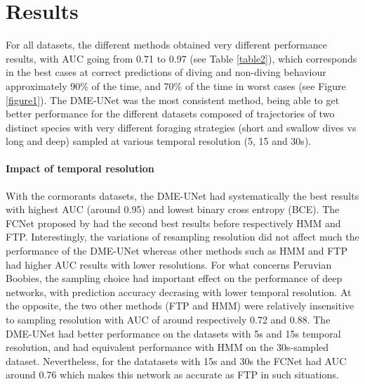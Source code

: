 \documentclass{article}
\begin{document}
\section{Results}
For all datasets, the different methods obtained very different performance results, with AUC going from 0.71 to 0.97 (see Table \ref{table2}), which corresponds in the best cases at correct predictions of diving and non-diving behaviour approximately 90\% of the time, and 70\% of the time in worst cases (see Figure \ref{figure1}). The DME-UNet was the most consistent method, being able to get better performance for the different datasets composed of trajectories of two distinct species with very different foraging strategies (short and swallow dives vs long and deep) sampled at various temporal resolution (5, 15 and 30s).

\paragraph{Impact of temporal resolution}
With the cormorants datasets, the DME-UNet had systematically the best results with highest AUC (around 0.95) and lowest binary cross entropy (BCE).
The FCNet proposed by \cite{browning_predicting_2018} had the second best results before respectively HMM and FTP.
Interestingly, the variations of resampling resolution did not affect much the performance of the DME-UNet whereas other methods such as HMM and FTP had higher AUC results with lower resolutions.
For what concerns Peruvian Boobies, the sampling choice had important effect on the performance of deep networks, with prediction accuracy decrasing with lower temporal resolution.
At the opposite, the two other methods (FTP and HMM) were relatively insensitive to sampling resolution with AUC of around respectively 0.72 and 0.88.
The DME-UNet had better performance on the datasets with 5s and 15s temporal resolution, and had equivalent performance with HMM on the 30s-sampled dataset.
Nevertheless, for the datatasets with 15s and 30s the FCNet had AUC around 0.76 which makes this network as accurate as FTP in such situations.
\end{document}
